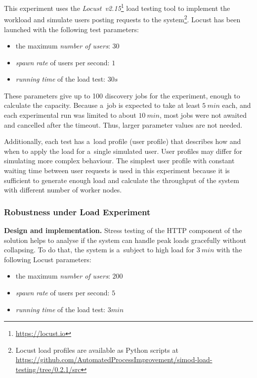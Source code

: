 \documentclass[12pt]{article}
\begin{document}
This experiment uses the \emph{Locust~v2.15}\footnote{\href{https://locust.io}{https://locust.io}} load testing tool to implement the workload and simulate users posting requests to the system\footnote{Locust load profiles are available as Python scripts at\\ \href{https://github.com/AutomatedProcessImprovement/simod-load-testing/tree/0.2.1/src}{https://github.com/AutomatedProcessImprovement/simod-load-testing/tree/0.2.1/src}}. Locust has been launched with the following test parameters: 

\begin{itemize}
    \item the maximum \emph{number of users}: $30$
    \item \emph{spawn rate} of users per second: $1$
    \item \emph{running time} of the load test: $30s$
\end{itemize}

\noindent
These parameters give up to 100 discovery jobs for the experiment, enough to calculate the capacity. Because a~job is expected to take at least $5~min$ each, and each experimental run was limited to about $10~min$, most jobs were not awaited and cancelled after the timeout. Thus, larger parameter values are not needed.

Additionally, each test has a~load profile (user profile) that describes how and when to apply the load for a~single simulated user. User profiles may differ for simulating more complex behaviour. The simplest user profile with constant waiting time between user requests is used in this experiment because it is sufficient to generate enough load and calculate the throughput of the system with different number of worker nodes.

\subsubsection{Robustness under Load Experiment}

\textbf{Design and implementation.} Stress testing of the HTTP component of the solution helps to analyse if the system can handle peak loads gracefully without collapsing. To do that, the system is a~subject to high load for $3~min$ with the following Locust parameters:

\begin{itemize}
    \item the maximum \emph{number of users}: $200$
    \item \emph{spawn rate} of users per second: $5$
    \item \emph{running time} of the load test: $3min$
\end{itemize}
\end{document}
